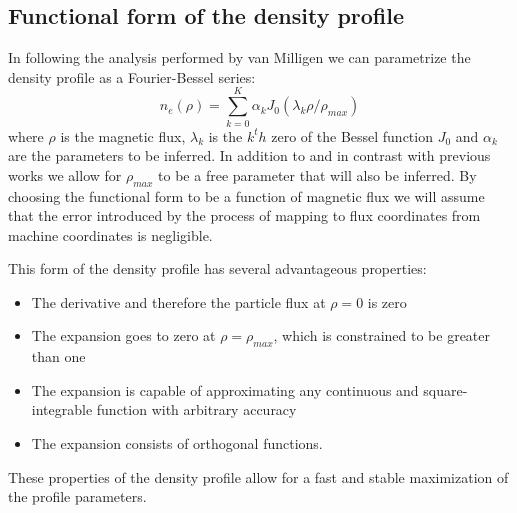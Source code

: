 \documentclass[12pt]{article}
\numberwithin{equation}{section}
\begin{document}
\subsection{Functional form of the density profile}
In following the analysis performed by van Milligen we can 
parametrize the density profile as a Fourier-Bessel series:
\begin{equation} \label{eq:densityform}
	n_e(\rho) = \sum\limits_{k=0}^K \alpha_k J_0(\lambda_k \rho/
	\rho_{max})
\end{equation}
where $\rho$ is the magnetic flux, $\lambda_k$ is the $k^th$ zero of 
the Bessel function $J_0$ and $\alpha_k$ are the parameters to be 
inferred. In addition to and in contrast with previous works we allow 
for $\rho_{max}$ to be a free parameter that will also be inferred. By 
choosing the functional form to be a function of magnetic flux we will 
assume that the error introduced by the process of mapping to flux 
coordinates from machine coordinates is negligible.

This form of the density profile has several advantageous properties:
\begin{itemize}
	\item The derivative and therefore the particle flux at $\rho = 0$ is zero
	\item The expansion goes to zero at $\rho = \rho_{max}$, which is constrained to be greater than one  
	\item The expansion is capable of approximating any continuous and square-integrable function with arbitrary accuracy
	\item The expansion consists of orthogonal functions.
\end{itemize}
These properties of the density profile allow for a fast and stable 
maximization of the profile parameters. 
\end{document}
